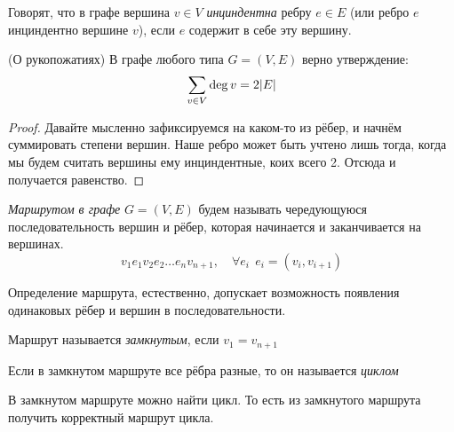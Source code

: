 \begin{definition}
	Говорят, что в графе вершина $v \in V$ \textit{инциндентна} ребру $e \in E$ (или ребро $e$ инциндентно вершине $v$), если $e$ содержит в себе эту вершину.
\end{definition}

\begin{lemma} (О рукопожатиях)
	В графе любого типа $G = (V, E)$ верно утверждение:
	\[
		\sum\limits_{v \in V} \deg v = 2|E|
	\]
\end{lemma}

\begin{proof}
	Давайте мысленно зафиксируемся на каком-то из рёбер, и начнём суммировать степени вершин. Наше ребро может быть учтено лишь тогда, когда мы будем считать вершины ему инциндентные, коих всего 2. Отсюда и получается равенство.
\end{proof}

\begin{definition}
	\textit{Маршрутом в графе} $G = (V, E)$ будем называть чередующуюся последовательность вершин и рёбер, которая начинается и заканчивается на вершинах.
	\[
		v_1 e_1 v_2 e_2 \ldots e_n v_{n + 1}, \quad \forall e_i\ \ e_i = (v_i, v_{i + 1})
	\]
\end{definition}

\begin{note}
	Определение маршрута, естественно, допускает возможность появления одинаковых рёбер и вершин в последовательности.
\end{note}

\begin{definition}
	Маршрут называется \textit{замкнутым}, если $v_1 = v_{n + 1}$
\end{definition}

\begin{definition}
	Если в замкнутом маршруте все рёбра разные, то он называется \textit{циклом}
\end{definition}

\begin{lemma}
	В замкнутом маршруте можно найти цикл. То есть из замкнутого маршрута получить корректный маршрут цикла.
\end{lemma}

